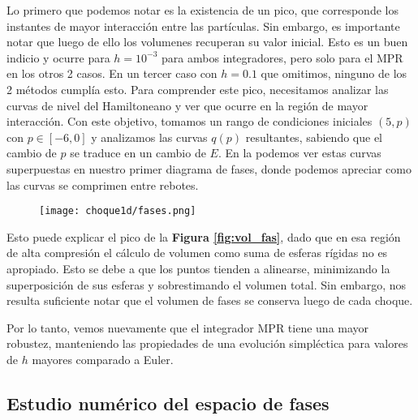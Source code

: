 Lo primero que podemos notar es la existencia de un pico, que corresponde los instantes de mayor interacción entre las partículas.
Sin embargo, es importante notar que luego de ello los volumenes recuperan su valor inicial.
Esto es un buen indicio y ocurre para $h=10^{-3}$ para ambos integradores, pero solo para el MPR en los otros 2 casos.
En un tercer caso con $h=0.1$ que omitimos, ninguno de los 2 métodos cumplía esto.
Para comprender este pico, necesitamos analizar las curvas de nivel del Hamiltoneano y ver que ocurre en la región de mayor interacción.
Con este objetivo, tomamos un rango de condiciones iniciales $(5,p)$ con $p\in [-6,0]$ y analizamos las curvas $q(p)$ resultantes, sabiendo que el cambio de $p$ se traduce en un cambio de $E$. 
En la  podemos ver estas curvas superpuestas en nuestro primer diagrama de fases, donde podemos apreciar como las curvas se comprimen entre rebotes.

\begin{figure}[h]
	\centering
	\texttt{[image: choque1d/fases.png]}
\end{figure}

Esto puede explicar el pico de la \textbf{Figura \ref{fig:vol_fas}}, dado que en esa región de alta compresión el cálculo de volumen como suma de esferas rígidas no es apropiado.
Esto se debe a que los puntos tienden a alinearse, minimizando la superposición de sus esferas y sobrestimando el volumen total.
Sin embargo, nos resulta suficiente notar que el volumen de fases se conserva luego de cada choque.

Por lo tanto, vemos nuevamente que el integrador MPR tiene una mayor robustez, manteniendo las propiedades de una evolución simpléctica para valores de $h$ mayores comparado a Euler.


\subsection{Estudio numérico del espacio de fases}
